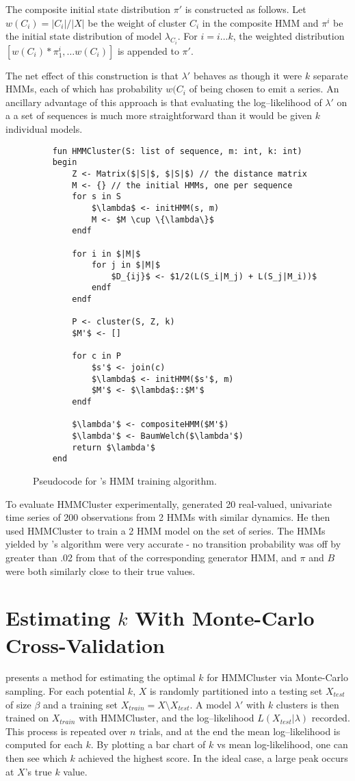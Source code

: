 The composite initial state distribution $\pi'$ is constructed as follows. Let $w({C_i}) = |C_i|/|X|$ be the weight of cluster $C_i$ in the composite HMM and $\pi^i$ be the initial state distribution of model $\lambda_{C_i}$. For $i = i \dots k$, the weighted distribution $[w(C_i)*\pi^i_1, \dots w(C_i)]$ is appended to $\pi'$.

The net effect of this construction is that $\lambda'$ behaves as though it were $k$ separate HMMs, each of which has probability $w({C_i}$ of being chosen to emit a series. An ancillary advantage of this approach is that evaluating the log--likelihood of $\lambda'$ on a a set of sequences is much more straightforward than it would be given $k$ individual models.
\begin{figure}
	\begin{lstlisting}
	fun HMMCluster(S: list of sequence, m: int, k: int)
	begin
		Z <- Matrix($|S|$, $|S|$) // the distance matrix
		M <- {} // the initial HMMs, one per sequence
		for s in S
			$\lambda$ <- initHMM(s, m)
			M <- $M \cup \{\lambda\}$
		endf

		for i in $|M|$
			for j in $|M|$
				$D_{ij}$ <- $1/2(L(S_i|M_j) + L(S_j|M_i))$
			endf
		endf

		P <- cluster(S, Z, k)
		$M'$ <- []

		for c in P
			$s'$ <- join(c)
			$\lambda$ <- initHMM($s'$, m)
			$M'$ <- $\lambda$::$M'$
		endf

		$\lambda'$ <- compositeHMM($M'$)
		$\lambda'$ <- BaumWelch($\lambda'$)
		return $\lambda'$
	end
	\end{lstlisting}
	\caption{Pseudocode for \citet{smyth}'s HMM training algorithm.}
	\label{fig:hmmcluster}
\end{figure}
To evaluate HMMCluster experimentally, \citeauthor{smyth} generated 20 real-valued, univariate time series of 200 observations from 2 HMMs with similar dynamics. He then used HMMCluster to train a 2 HMM model on the set of series. The HMMs yielded by \citeauthor{smyth}'s algorithm were very accurate - no transition probability was off by greater than .02 from that of the corresponding generator HMM, and $\pi$ and $B$ were both similarly close to their true values.

\section{Estimating $k$ With Monte-Carlo Cross-Validation}
\citeauthor{smyth} presents a method for estimating the optimal $k$ for HMMCluster via Monte-Carlo sampling. For each potential $k$, $X$ is randomly partitioned into a testing set $X_{test}$ of size $\beta$ and a training set $X_{train} = X \setminus X_{test}$. A model $\lambda'$ with $k$ clusters is then trained on $X_{train}$ with HMMCluster, and the log--likelihood $L(X_{test}|\lambda)$ recorded. This process is repeated over $n$ trials, and at the end the mean log--likelihood is computed for each $k$. By plotting a bar chart of $k$ vs mean log-likelihood, one can then see which $k$ achieved the highest score. In the ideal case, a large peak occurs at $X$'s true $k$ value.
